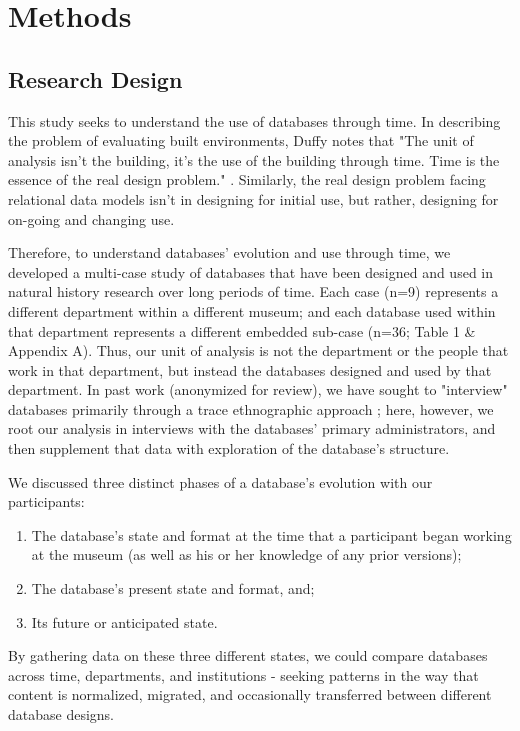 \section{Methods}

\subsection{Research Design}

This study seeks to understand the use of databases through time. In describing the problem of evaluating built environments, Duffy notes that "The unit of analysis isn't the building, it's the use of the building through time. Time is the essence of the real design problem." \cite{duffy1990measuring}. Similarly, the real design problem facing relational data models isn't in designing for initial use, but rather, designing for on-going and changing use. 

Therefore, to understand databases' evolution and use through time, we developed a multi-case study of databases that have been designed and used in natural history research over long periods of time. Each case (n=9) represents a different department within a different museum; and each database used within that department represents a different embedded sub-case (n=36; Table 1 & Appendix A). Thus, our unit of analysis is not the department or the people that work in that department, but instead the databases designed and used by that department. In past work (anonymized for review), we have sought to "interview" databases primarily through a trace ethnographic approach \cite{Geiger_2011}; here, however, we root our analysis in interviews with the databases' primary administrators, and then supplement that data with exploration of the database's structure. 

We discussed three distinct phases of a database's evolution with our participants: 
\begin{enumerate}
\item The database's state and format at the time that a participant began working at the museum (as well as his or her knowledge of any prior versions); 
\item The database's present state and format, and; 
\item Its future or anticipated state. 
\end{enumerate}
By gathering data on these three different states, we could  compare databases across time, departments, and institutions - seeking patterns in the way that content is normalized, migrated, and occasionally transferred between different database designs. 

